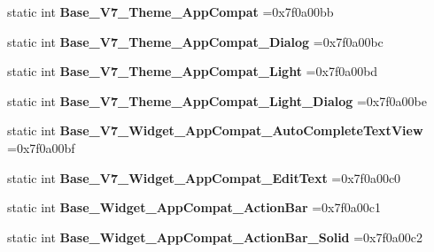 \begin{DoxyCompactItemize}
static int {\bfseries Base\+\_\+\+V7\+\_\+\+Theme\+\_\+\+App\+Compat} =0x7f0a00bb
\item 
\mbox{\label{classandroid_1_1support_1_1v7_1_1appcompat_1_1R_1_1style_a7dd7a9b03634d60eb7e860c537b0df25}} 
static int {\bfseries Base\+\_\+\+V7\+\_\+\+Theme\+\_\+\+App\+Compat\+\_\+\+Dialog} =0x7f0a00bc
\item 
\mbox{\label{classandroid_1_1support_1_1v7_1_1appcompat_1_1R_1_1style_aded4f3b799b65e550c42057a9fc09d09}} 
static int {\bfseries Base\+\_\+\+V7\+\_\+\+Theme\+\_\+\+App\+Compat\+\_\+\+Light} =0x7f0a00bd
\item 
\mbox{\label{classandroid_1_1support_1_1v7_1_1appcompat_1_1R_1_1style_a835e8645a03301d633b097116ddcc18a}} 
static int {\bfseries Base\+\_\+\+V7\+\_\+\+Theme\+\_\+\+App\+Compat\+\_\+\+Light\+\_\+\+Dialog} =0x7f0a00be
\item 
\mbox{\label{classandroid_1_1support_1_1v7_1_1appcompat_1_1R_1_1style_a950d3fdb96db43f0b2fa688224469b44}} 
static int {\bfseries Base\+\_\+\+V7\+\_\+\+Widget\+\_\+\+App\+Compat\+\_\+\+Auto\+Complete\+Text\+View} =0x7f0a00bf
\item 
\mbox{\label{classandroid_1_1support_1_1v7_1_1appcompat_1_1R_1_1style_a022d9df7f62af8a38b8e22f919490b63}} 
static int {\bfseries Base\+\_\+\+V7\+\_\+\+Widget\+\_\+\+App\+Compat\+\_\+\+Edit\+Text} =0x7f0a00c0
\item 
\mbox{\label{classandroid_1_1support_1_1v7_1_1appcompat_1_1R_1_1style_a720a247016da96debd72760573a70041}} 
static int {\bfseries Base\+\_\+\+Widget\+\_\+\+App\+Compat\+\_\+\+Action\+Bar} =0x7f0a00c1
\item 
\mbox{\label{classandroid_1_1support_1_1v7_1_1appcompat_1_1R_1_1style_ab536eac1e3dfca6694421e790bf7d100}} 
static int {\bfseries Base\+\_\+\+Widget\+\_\+\+App\+Compat\+\_\+\+Action\+Bar\+\_\+\+Solid} =0x7f0a00c2

\end{DoxyCompactItemize}
